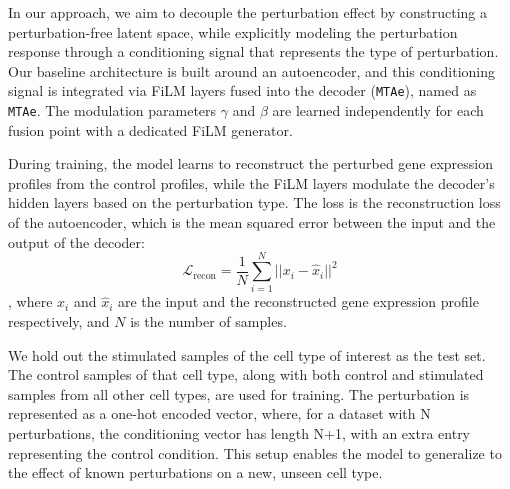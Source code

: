 \documentclass[12pt, a4paper]{article}
\begin{document}


In our approach, we aim to decouple the perturbation effect by constructing a perturbation-free latent space, while explicitly modeling the perturbation response through a conditioning signal that represents the type of perturbation. Our baseline architecture is built around an autoencoder, and this conditioning signal is integrated via FiLM layers fused into the decoder (\verb|MTAe|), named as \verb|MTAe|. The modulation parameters $\gamma$ and $\beta$ are learned independently for each fusion point with a dedicated FiLM generator.

During training, the model learns to reconstruct the perturbed gene expression profiles from the control profiles, while the FiLM layers modulate the decoder's hidden layers based on the perturbation type.
The loss is the reconstruction loss of the autoencoder, which is the mean squared error between the input and the output of the decoder:
\[
\mathcal{L}_{\text{recon}} = \frac{1}{N} \sum_{i=1}^{N} ||x_i - \hat{x}_i||^2 \]
, where $x_i$ and $\hat{x}_i$ are the input and the reconstructed gene expression profile respectively, and $N$ is the number of samples.


We hold out the stimulated samples of the cell type of interest as the test set. The control samples of that cell type, along with both control and stimulated samples from all other cell types, are used for training. The perturbation is represented as a one-hot encoded vector, where, for a dataset with N perturbations, the conditioning vector has length N+1, with an extra entry representing the control condition. This setup enables the model to generalize to the effect of known perturbations on a new, unseen cell type.
\end{document}
